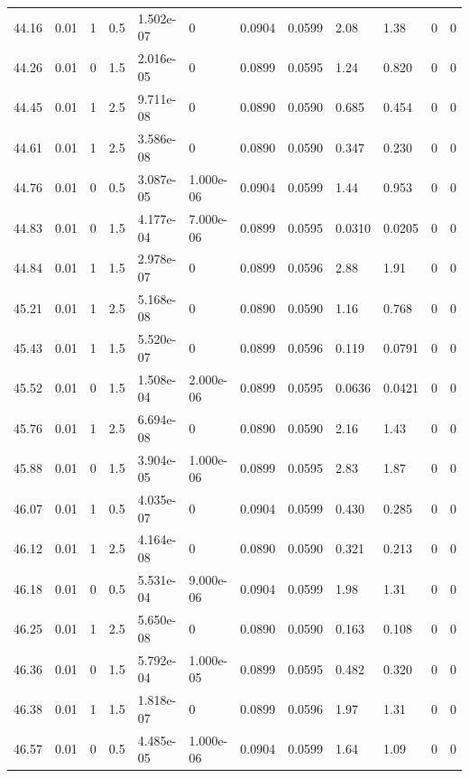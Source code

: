 \documentclass[preview]{standalone}
\begin{document}
{{{{{{{{{\begin{tabular}{L{1.2cm}C{1.2cm} C{0.3cm}C{0.5cm} C{1.4cm}C{1.4cm} C{1.4cm}C{1.4cm} C{1.6cm}C{1.6cm} C{1.6cm}C{1.6cm}}
  44.16  &  0.01  & 1     & 0.5 &  1.502e-07  & 0  &  0.0904&   0.0599& 2.08 & 1.38   &  0 & 0  \\ 
  44.26  &  0.01  & 0     & 1.5 &  2.016e-05  & 0  &  0.0899&   0.0595& 1.24 & 0.820   &  0 & 0  \\ 
  44.45  &  0.01  & 1     & 2.5 &  9.711e-08  & 0  &  0.0890&   0.0590& 0.685 & 0.454   &  0 & 0  \\ 
  44.61  &  0.01  & 1     & 2.5 &  3.586e-08  & 0  &  0.0890&   0.0590& 0.347 & 0.230   &  0 & 0  \\ 
  44.76  &  0.01  & 0     & 0.5 &  3.087e-05  & 1.000e-06  &  0.0904&   0.0599& 1.44 & 0.953   &  0 & 0  \\ 
  44.83  &  0.01  & 0     & 1.5 &  4.177e-04  & 7.000e-06  &  0.0899&   0.0595& 0.0310 & 0.0205   &  0 & 0  \\ 
  44.84  &  0.01  & 1     & 1.5 &  2.978e-07  & 0  &  0.0899&   0.0596& 2.88 & 1.91   &  0 & 0  \\ 
  45.21  &  0.01  & 1     & 2.5 &  5.168e-08  & 0  &  0.0890&   0.0590& 1.16 & 0.768   &  0 & 0  \\ 
  45.43  &  0.01  & 1     & 1.5 &  5.520e-07  & 0  &  0.0899&   0.0596& 0.119 & 0.0791   &  0 & 0  \\ 
  45.52  &  0.01  & 0     & 1.5 &  1.508e-04  & 2.000e-06  &  0.0899&   0.0595& 0.0636 & 0.0421   &  0 & 0  \\ 
  45.76  &  0.01  & 1     & 2.5 &  6.694e-08  & 0  &  0.0890&   0.0590& 2.16 & 1.43   &  0 & 0  \\ 
  45.88  &  0.01  & 0     & 1.5 &  3.904e-05  & 1.000e-06  &  0.0899&   0.0595& 2.83 & 1.87   &  0 & 0  \\ 
  46.07  &  0.01  & 1     & 0.5 &  4.035e-07  & 0  &  0.0904&   0.0599& 0.430 & 0.285   &  0 & 0  \\ 
  46.12  &  0.01  & 1     & 2.5 &  4.164e-08  & 0  &  0.0890&   0.0590& 0.321 & 0.213   &  0 & 0  \\ 
  46.18  &  0.01  & 0     & 0.5 &  5.531e-04  & 9.000e-06  &  0.0904&   0.0599& 1.98 & 1.31   &  0 & 0  \\ 
  46.25  &  0.01  & 1     & 2.5 &  5.650e-08  & 0  &  0.0890&   0.0590& 0.163 & 0.108   &  0 & 0  \\ 
  46.36  &  0.01  & 0     & 1.5 &  5.792e-04  & 1.000e-05  &  0.0899&   0.0595& 0.482 & 0.320   &  0 & 0  \\ 
  46.38  &  0.01  & 1     & 1.5 &  1.818e-07  & 0  &  0.0899&   0.0596& 1.97 & 1.31   &  0 & 0  \\ 
  46.57  &  0.01  & 0     & 0.5 &  4.485e-05  & 1.000e-06  &  0.0904&   0.0599& 1.64 & 1.09   &  0 & 0  \\ 

\end{tabular}}}}}}}}}}
\end{document}
